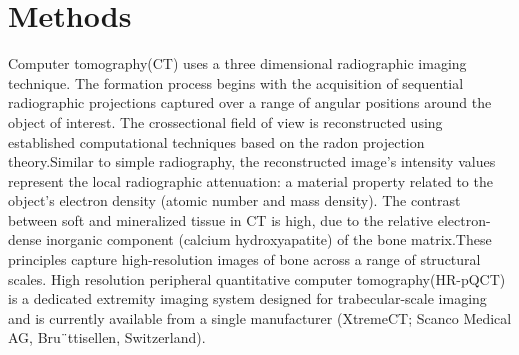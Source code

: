 \documentclass[
a4paper, 
12pt,
grayscalebody, %
abstract=on,
twoside, BCOR10mm, 12pt, DIV13,headinclude, footexclude, final, abstracton, openright
]{ibireprt}
\numberwithin{equation}{chapter}
\numberwithin{table}{chapter}
\numberwithin{figure}{chapter}
\numberwithin{algorithm}{chapter}
\numberwithin{example}{chapter}
\numberwithin{example}{chapter}
\begin{document}
\chapter{Methods}
Computer tomography(CT) uses a three dimensional radiographic imaging technique. The formation process begins with the acquisition of sequential radiographic projections captured over a range of angular positions around the object of interest. The crossectional field of view is reconstructed using established computational techniques based on the radon projection theory\cite{article}.Similar to simple radiography, the reconstructed image’s intensity values represent the local radiographic attenuation: a material property related to the object’s electron density (atomic number and mass density). The contrast between soft and mineralized tissue in CT is high, due to the relative electron-dense inorganic component (calcium hydroxyapatite) of the bone matrix.These principles capture high-resolution images of bone
across a range of structural scales. %
High resolution peripheral quantitative computer tomography(HR-pQCT) is a  dedicated extremity imaging system designed for trabecular-scale imaging and is currently available from a single manufacturer (XtremeCT; Scanco Medical AG,
Bru¨ttisellen, Switzerland). 
\end{document}
